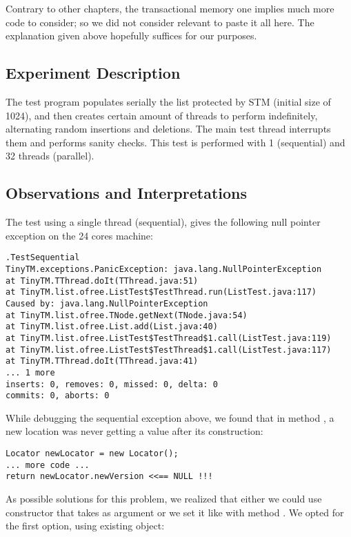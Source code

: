 Contrary to other chapters, the transactional memory one implies much
more code to consider; so we did not consider relevant to paste it all
here. The explanation given above hopefully suffices for our purposes.

\subsection{Experiment Description}
The test program populates serially the list protected by STM (initial
size of 1024), and then creates certain amount of threads to perform
indefinitely, alternating random insertions and deletions. The main
test thread interrupts them and performs sanity checks. This test is
performed with 1 (sequential) and 32 threads (parallel).

\subsection{Observations and Interpretations}
The test using a single thread (sequential), gives the following null
pointer exception on the 24 cores machine: \\

\begin{verbatim}
.TestSequential
TinyTM.exceptions.PanicException: java.lang.NullPointerException
at TinyTM.TThread.doIt(TThread.java:51)
at TinyTM.list.ofree.ListTest$TestThread.run(ListTest.java:117)
Caused by: java.lang.NullPointerException
at TinyTM.list.ofree.TNode.getNext(TNode.java:54)
at TinyTM.list.ofree.List.add(List.java:40)
at TinyTM.list.ofree.ListTest$TestThread$1.call(ListTest.java:119)
at TinyTM.list.ofree.ListTest$TestThread$1.call(ListTest.java:117)
at TinyTM.TThread.doIt(TThread.java:41)
... 1 more
inserts: 0, removes: 0, missed: 0, delta: 0
commits: 0, aborts: 0
\end{verbatim}
\hfill

While debugging the sequential exception above, we found that in method
, a new location was never getting a
 value after its construction: \\

\begin{lstlisting}[style=nonumbers]
Locator newLocator = new Locator();
... more code ...
return newLocator.newVersion <<== NULL !!!
\end{lstlisting}
\hfill

As possible solutions for this problem, we realized that either we
could use constructor that takes   as argument or we set
it like with method . We opted for the first option, using
existing  object: \\

